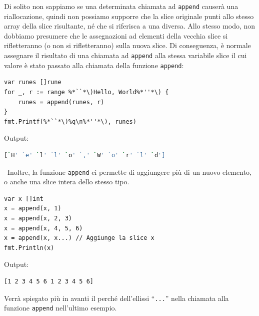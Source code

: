Di solito non sappiamo se una determinata chiamata ad \verb|append| causerà una riallocazione, quindi non possiamo supporre che la slice originale punti allo stesso array della slice risultante, né che si riferisca a una diversa.
Allo stesso modo, non dobbiamo presumere che le assegnazioni ad elementi della vecchia slice si rifletteranno (o non si rifletteranno) sulla nuova slice.
Di conseguenza, è normale assegnare il risultato di una chiamata ad \verb|append| alla stessa variabile slice il cui valore è stato passato alla chiamata della funzione \verb|append|:
\begin{lstlisting}[frame=single, label={lst:lstlisting3-2.8}]
var runes []rune
for _, r := range %*``*\)Hello, World%*''*\) {
    runes = append(runes, r)
}
fmt.Printf(%*``*\)%q\n%*''*\), runes)
\end{lstlisting}
Output:
\begin{lstlisting}[language=bash, frame=L, label={lst:lstlisting3-2.9}]
[`H' `e' `l' `l' `o' `,' `W' `o' `r' `l' `d']
\end{lstlisting}
\
Inoltre, la funzione \verb|append| ci permette di aggiungere più di un nuovo elemento, o anche una slice intera dello stesso tipo.
\begin{lstlisting}[frame=single, label={lst:lstlisting3-2.10}]
var x []int
x = append(x, 1)
x = append(x, 2, 3)
x = append(x, 4, 5, 6)
x = append(x, x...) // Aggiunge la slice x
fmt.Println(x)
\end{lstlisting}
Output:
\begin{lstlisting}[language=bash, frame=L, label={lst:lstlisting3-2.11}]
[1 2 3 4 5 6 1 2 3 4 5 6]
\end{lstlisting}
Verrà spiegato più in avanti il perché dell'ellissi ``\verb|...|'' nella chiamata alla funzione \verb|append| nell'ultimo esempio.

